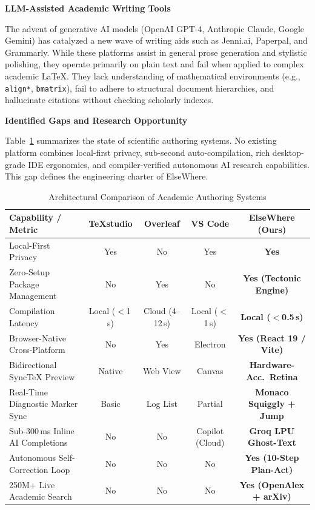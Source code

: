 \documentclass[12pt,a4paper,twoside]{article}
\newcommand{\subhead}[2]{%
  \begingroup\setlength{\parskip}{0pt}\vspace{10pt}%
  \noindent\hspace*{0.25in}\makebox[0.35in][l]{\fontsize{13pt}{15.6pt}\selectfont\bfseries #1}%
  {\fontsize{13pt}{15.6pt}\selectfont\bfseries #2}\par\nopagebreak
  \vspace{4pt}
  \endgroup}
\newcommand{\code}[1]{\texttt{#1}}
\begin{document}
\subhead{2.3}{LLM-Assisted Academic Writing Tools}
The advent of generative AI models (OpenAI GPT-4, Anthropic Claude, Google Gemini) has catalyzed a new wave of writing aids such as Jenni.ai, Paperpal, and Grammarly. While these platforms assist in general prose generation and stylistic polishing, they operate primarily on plain text and fail when applied to complex academic \LaTeX{}. They lack understanding of mathematical environments (e.g., \code{align*}, \code{bmatrix}), fail to adhere to structural document hierarchies, and hallucinate citations without checking scholarly indexes.

\subhead{2.4}{Identified Gaps and Research Opportunity}
Table~\ref{tab:lit_comparison} summarizes the state of scientific authoring systems. No existing platform combines local-first privacy, sub-second auto-compilation, rich desktop-grade IDE ergonomics, and compiler-verified autonomous AI research capabilities. This gap defines the engineering charter of ElseWhere.

\begin{table}[htbp]
\centering
\caption{Architectural Comparison of Academic Authoring Systems}
\label{tab:lit_comparison}
\vspace{4pt}
\small
\renewcommand{\arraystretch}{1.3}
\begin{tabularx}{\textwidth}{>{\raggedright\arraybackslash}p{3.8cm}cccc}
\toprule
\textbf{Capability / Metric} & \textbf{\TeX{}studio} & \textbf{Overleaf} & \textbf{VS Code} & \textbf{ElseWhere (Ours)} \\
\midrule
Local-First Privacy & Yes & No & Yes & \textbf{Yes} \\
Zero-Setup Package Management & No & Yes & No & \textbf{Yes (Tectonic Engine)} \\
Compilation Latency & Local ($<$1\,s) & Cloud (4--12\,s) & Local ($<$1\,s) & \textbf{Local ($<$0.5\,s)} \\
Browser-Native Cross-Platform & No & Yes & Electron & \textbf{Yes (React 19 / Vite)} \\
Bidirectional Sync\TeX{} Preview & Native & Web View & Canvas & \textbf{Hardware-Acc.\ Retina} \\
Real-Time Diagnostic Marker Sync & Basic & Log List & Partial & \textbf{Monaco Squiggly + Jump} \\
Sub-300\,ms Inline AI Completions & No & No & Copilot (Cloud) & \textbf{Groq LPU Ghost-Text} \\
Autonomous Self-Correction Loop & No & No & No & \textbf{Yes (10-Step Plan-Act)} \\
250M+ Live Academic Search & No & No & No & \textbf{Yes (OpenAlex + arXiv)} \\
\bottomrule
\end{tabularx}
\end{table}
\end{document}
